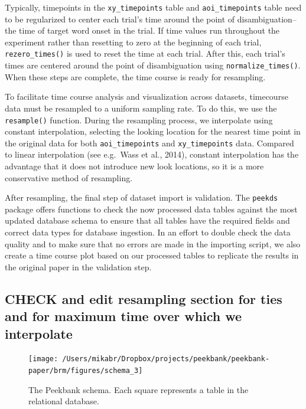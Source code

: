 \documentclass[
  english,
  man,floatsintext]{apa6}
\begin{document}
Typically, timepoints in the \texttt{xy\_timepoints} table and \texttt{aoi\_timepoints} table need to be regularized to center each trial's time around the point of disambiguation--the time of target word onset in the trial.
If time values run throughout the experiment rather than resetting to zero at the beginning of each trial, \texttt{rezero\_times()} is used to reset the time at each trial.
After this, each trial's times are centered around the point of disambiguation using \texttt{normalize\_times()}.
When these steps are complete, the time course is ready for resampling.

To facilitate time course analysis and visualization across datasets, timecourse data must be resampled to a uniform sampling rate.
To do this, we use the \texttt{resample()} function.
During the resampling process, we interpolate using constant interpolation, selecting the looking location for the nearest time point in the original data for both \texttt{aoi\_timepoints} and \texttt{xy\_timepoints} data.
Compared to linear interpolation (see e.g.~Wass et al., 2014), constant interpolation has the advantage that it does not introduce new look locations, so it is a more conservative method of resampling.

After resampling, the final step of dataset import is validation.
The \texttt{peekds} package offers functions to check the now processed data tables against the most updated database schema to ensure that all tables have the required fields and correct data types for database ingestion.
In an effort to double check the data quality and to make sure that no errors are made in the importing script, we also create a time course plot based on our processed tables to replicate the results in the original paper in the validation step.

\hypertarget{check-and-edit-resampling-section-for-ties-and-for-maximum-time-over-which-we-interpolate}{%
\subsection{CHECK and edit resampling section for ties and for maximum time over which we interpolate}\label{check-and-edit-resampling-section-for-ties-and-for-maximum-time-over-which-we-interpolate}}

\begin{figure}

{\centering \texttt{[image: /Users/mikabr/Dropbox/projects/peekbank/peekbank-paper/brm/figures/schema\_3]} 

}

\caption{The Peekbank schema. Each square represents a table in the relational database.}\label{fig:fig-schema}
\end{figure}
\end{document}
